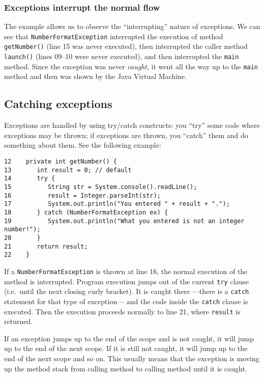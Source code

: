 \subsubsection*{Exceptions interrupt the normal flow}
\label{sec:except-interr-norm}

The example allows us to observe the ``interrupting'' nature of
exceptions. We can see that \verb+NumberFormatException+ interrupted the execution
of method \verb+getNumber()+ (line 15 was never executed), then
interrupted the caller method \verb+launch()+ (lines 09--10 were never
executed), and then interrupted the \verb+main+ method. Since the
exception was never \emph{caught}, it went all the way up to the
\verb+main+ method and then was shown by the Java Virtual Machine. 

\subsection{Catching exceptions}
\label{sec:catching-exception}

Exceptions are handled by using try/catch constructs: you ``try'' some
code where exceptions may be thrown; if exceptions are thrown, you
``catch'' them and do something about them. See the following example: 

\begin{verbatim}
12    private int getNumber() {
13       int result = 0; // default
14       try { 
15          String str = System.console().readLine();
16          result = Integer.parseInt(str);
17          System.out.println("You entered " + result + ".");
18       } catch (NumberFormatException ex) {
19          System.out.println("What you entered is not an integer number!");
20       }
21       return result;
22    }
\end{verbatim}

If a \verb+NumberFormatException+ is thrown at line 16, the normal
execution of the method is interrupted. Program execution jumps out of
the current \verb+try+ clause (i.e.~until the next closing curly
bracket). It is caught there ---there is a \verb+catch+ statement for
that type of exception--- and the code inside the \verb+catch+ clause is 
executed. Then the execution proceeds normally to line 21, where
\verb+result+ is returned. 

If an exception jumps up to the end of the scope and is not caught, it
will jump up to the end of the next scope. If it is still not caught,
it will jump up to the end of the next scope and so on. This usually
means that the exception is moving up the method stack from calling
method to calling method until it is caught. 

